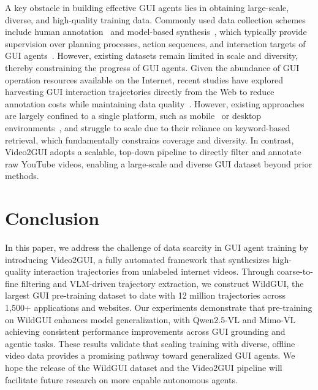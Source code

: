 \documentclass{llmxive}
\begin{document}
A key obstacle in building effective GUI agents lies in obtaining large-scale, diverse, and high-quality training data. Commonly used data collection schemes include human annotation~\citep{deng2023mind2web, li2024effects} and model-based synthesis~\citep{li2024effects, lu2025guiodyssey}, which typically provide supervision over planning processes, action sequences, and interaction targets of GUI agents~\citep{cheng2024seeclick, lu2024omniparser}. However, existing datasets remain limited in scale and diversity, thereby constraining the progress of GUI agents.
Given the abundance of GUI operation resources available on the Internet, recent studies have explored harvesting GUI interaction trajectories directly from the Web to reduce annotation costs while maintaining data quality~\citep{lu2025videoagenttrek, zhang2025tongui}. However, existing approaches are largely confined to a single platform, such as mobile~\citep{jang2025scalable} or desktop environments~\citep{song2025watch}, and struggle to scale due to their reliance on keyword-based retrieval, which fundamentally constrains coverage and diversity. In contrast, Video2GUI adopts a scalable, top-down pipeline to directly filter and annotate raw YouTube videos, enabling a large-scale and diverse GUI dataset beyond prior methods.


\section{Conclusion}
In this paper, we address the challenge of data scarcity in GUI agent training by introducing Video2GUI, a fully automated framework that synthesizes high-quality interaction trajectories from unlabeled internet videos. Through coarse-to-fine filtering and VLM-driven trajectory extraction, we construct WildGUI, the largest GUI pre-training dataset to date with 12 million trajectories across 1,500+ applications and websites. Our experiments demonstrate that pre-training on WildGUI enhances model generalization, with Qwen2.5-VL and Mimo-VL achieving consistent performance improvements across GUI grounding and agentic tasks. These results validate that scaling training with diverse, offline video data provides a promising pathway toward generalized GUI agents. We hope the release of the WildGUI dataset and the Video2GUI pipeline will facilitate future research on more capable autonomous agents.
\end{document}
